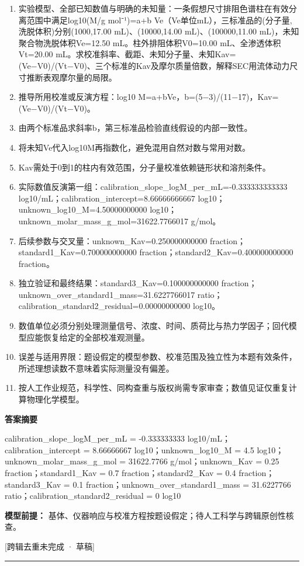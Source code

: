 \documentclass[UTF8,11pt,a4paper]{ctexart}
\begin{document}
\begin{enumerate}
\item 实验模型、全部已知数值与明确的未知量：一条假想尺寸排阻色谱柱在有效分离范围中满足log10(M/g mol⁻¹)=a+b Ve（Ve单位mL），三标准品的(分子量,洗脱体积)分别(1000,17.00 mL)、(10000,14.00 mL)、(100000,11.00 mL)，未知聚合物洗脱体积Ve=12.50 mL。柱外排阻体积V0=10.00 mL、全渗透体积Vt=20.00 mL。求校准斜率、截距、未知分子量、未知Kav=(Ve−V0)/(Vt−V0)、三个标准的Kav及摩尔质量倍数，解释SEC用流体动力尺寸推断表观摩尔量的局限。
\item 推导所用校准或反演方程：log10 M=a+bVe，b=(5−3)/(11−17)，Kav=(Ve−V0)/(Vt−V0)。
\item 由两个标准品求斜率b，第三标准品检验直线假设的内部一致性。
\item 将未知Ve代入log10M再指数化，避免混用自然对数与常用对数。
\item Kav需处于0到1的柱内有效范围，分子量校准依赖链形状和溶剂条件。
\item 实际数值反演第一组：calibration\_slope\_logM\_per\_mL=-0.333333333333 log10/mL；calibration\_intercept=8.66666666667 log10；unknown\_log10\_M=4.50000000000 log10；unknown\_molar\_mass\_g\_mol=31622.7766017 g/mol。
\item 后续参数与交叉量：unknown\_Kav=0.250000000000 fraction；standard1\_Kav=0.700000000000 fraction；standard2\_Kav=0.400000000000 fraction。
\item 独立验证和最终结果：standard3\_Kav=0.100000000000 fraction；unknown\_over\_standard1\_mass=31.6227766017 ratio；calibration\_standard2\_residual=0.00000000000 log10。
\item 数值单位必须分别处理测量信号、浓度、时间、质荷比与热力学因子；回代模型应能恢复给定的全部校准观测量。
\item 误差与适用界限：题设假定的模型参数、校准范围及独立性为本题有效条件，所述理想读数不意味着实际测量没有偏差。
\item 按人工作业规范，科学性、同构查重与版权尚需专家审查；数值见证仅重复计算物理化学模型。
\end{enumerate}
\noindent\textbf{答案摘要}\par
calibration\_slope\_logM\_per\_mL = -0.333333333 log10/mL；calibration\_intercept = 8.66666667 log10；unknown\_log10\_M = 4.5 log10；unknown\_molar\_mass\_g\_mol = 31622.7766 g/mol；unknown\_Kav = 0.25 fraction；standard1\_Kav = 0.7 fraction；standard2\_Kav = 0.4 fraction；standard3\_Kav = 0.1 fraction；unknown\_over\_standard1\_mass = 31.6227766 ratio；calibration\_standard2\_residual = 0 log10\par
\noindent\textbf{模型前提：}
基体、仪器响应与校准方程按题设假定；待人工科学与跨辑原创性核查。\par
\noindent\textcolor{red!65!black}{[跨辑去重未完成 · 草稿]} \par
\medskip\hrule\medskip
{}
\end{document}
